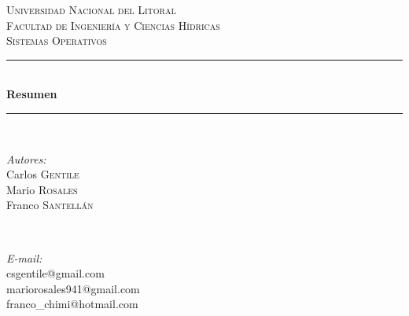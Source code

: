 \documentclass[10pt]{book}
\begin{document}
\begin{titlepage}
\newcommand{\HRule}{\rule{\linewidth}{0.5 mm}} %
\center %

\textsc{\huge Universidad Nacional del Litoral}\\[1 cm]
\textsc{\LARGE Facultad de Ingeniería y Ciencias Hídricas}\\[0.5 cm]
\textsc{\Large Sistemas Operativos}\\[2 cm]

\HRule \\[0.8 cm]
{ \huge \bfseries Resumen}\\[0.5 cm] %
\HRule \\[2 cm]
 
\begin{minipage}{0.4\textwidth}
\begin{flushleft} \large
\emph{Autores:}\\
Carlos \textsc{Gentile}\\
Mario \textsc{Rosales}\\
Franco \textsc{Santellán}\\
\end{flushleft}
\end{minipage}
~
\begin{minipage}{0.4\textwidth}
\begin{flushright} \large
\emph{E-mail:} \\
csgentile@gmail.com\\ %
mariorosales941@gmail.com\\
franco\_chimi@hotmail.com\\
\end{flushright}
\end{minipage}\\[2 cm]


\end{titlepage}
\end{document}
